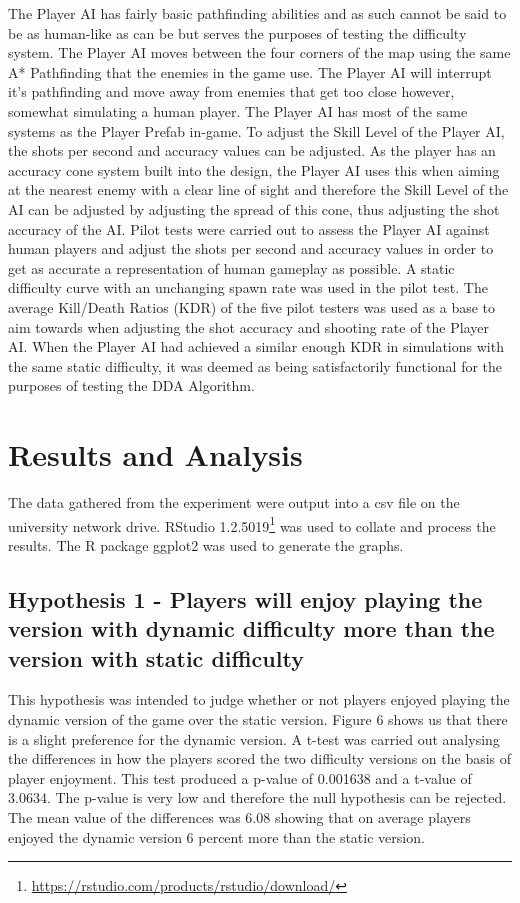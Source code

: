 \documentclass[journal]{IEEEtran}
\begin{document}
The Player AI has fairly basic pathfinding abilities and as such cannot be said to be as human-like as can be but serves the purposes of testing the difficulty system. The Player AI moves between the four corners of the map using the same A* Pathfinding that the enemies in the game use. The Player AI will interrupt it's pathfinding and move away from enemies that get too close however, somewhat simulating a human player. The Player AI has most of the same systems as the Player Prefab in-game. To adjust the Skill Level of the Player AI, the shots per second and accuracy values can be adjusted. As the player has an accuracy cone system built into the design, the Player AI uses this when aiming at the nearest enemy with a clear line of sight and therefore the Skill Level of the AI can be adjusted by adjusting the spread of this cone, thus adjusting the shot accuracy of the AI. Pilot tests were carried out to assess the Player AI against human players and adjust the shots per second and accuracy values in order to get as accurate a representation of human gameplay as possible. A static difficulty curve with an unchanging spawn rate was used in the pilot test. The average Kill/Death Ratios (KDR) of the five pilot testers was used as a base to aim towards when adjusting the shot accuracy and shooting rate of the Player AI. When the Player AI had achieved a similar enough KDR in simulations with the same static difficulty, it was deemed as being satisfactorily functional for the purposes of testing the DDA Algorithm.

\section{Results and Analysis}

The data gathered from the experiment were output into a csv file on the university network drive. RStudio 1.2.5019\footnote{\url{https://rstudio.com/products/rstudio/download/}} was used to collate and process the results. The R package ggplot2 was used to generate the graphs.

\subsection{Hypothesis 1 - Players will enjoy playing the version with dynamic difficulty more than the version with static difficulty}

This hypothesis was intended to judge whether or not players enjoyed playing the dynamic version of the game over the static version. Figure 6 shows us that there is a slight preference for the dynamic version. A t-test was carried out analysing the differences in how the players scored the two difficulty versions on the basis of player enjoyment. This test produced a p-value of 0.001638 and a t-value of 3.0634. The p-value is very low and therefore the null hypothesis can be rejected. The mean value of the differences was 6.08 showing that on average players enjoyed the dynamic version 6 percent more than the static version.
\end{document}
